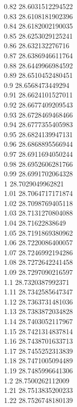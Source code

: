 {0.82	28.6031512294522\\
0.83	28.6108181902396\\
0.84	28.6182002190035\\
0.85	28.6253029125241\\
0.86	28.632132276716\\
0.87	28.6386946611764\\
0.88	28.6449966984592\\
0.89	28.6510452480451\\
0.9	28.6568473449294\\
0.91	28.6624101527011\\
0.92	28.6677409209543\\
0.93	28.6728469468466\\
0.94	28.6777355405983\\
0.95	28.6824139947131\\
0.96	28.6868895566944\\
0.97	28.6911694050244\\
0.98	28.6952606281766\\
0.99	28.6991702064328\\
1	28.7029049962821\\
1.01	28.7064717171874\\
1.02	28.7098769405118\\
1.03	28.7131270804088\\
1.04	28.71622838649\\
1.05	28.7191869380962\\
1.06	28.7220086400057\\
1.07	28.7246992194286\\
1.08	28.7272642241458\\
1.09	28.7297090216597\\
1.1	28.7320387992371\\
1.11	28.7342585647347\\
1.12	28.7363731481036\\
1.13	28.7383872034828\\
1.14	28.7403052117967\\
1.15	28.7421314837814\\
1.16	28.7438701633713\\
1.17	28.7455252313839\\
1.18	28.7471005094489\\
1.19	28.7485996641306\\
1.2	28.7500262112009\\
1.21	28.7513835200233\\
1.22	28.7526748180139\\
}
